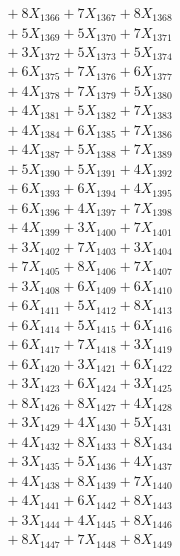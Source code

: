 \documentclass[a4paper,10pt]{article}
\begin{document}
{\begin{align}
&\;  + 8 X_{1366} + 7 X_{1367} + 8 X_{1368} \\[0.3ex]
&\;  + 5 X_{1369} + 5 X_{1370} + 7 X_{1371} \\[0.3ex]
&\;  + 3 X_{1372} + 5 X_{1373} + 5 X_{1374} \\[0.3ex]
&\;  + 6 X_{1375} + 7 X_{1376} + 6 X_{1377} \\[0.3ex]
&\;  + 4 X_{1378} + 7 X_{1379} + 5 X_{1380} \\[0.3ex]
&\;  + 4 X_{1381} + 5 X_{1382} + 7 X_{1383} \\[0.3ex]
&\;  + 4 X_{1384} + 6 X_{1385} + 7 X_{1386} \\[0.3ex]
&\;  + 4 X_{1387} + 5 X_{1388} + 7 X_{1389} \\[0.5ex]\allowbreak
&\;  + 5 X_{1390} + 5 X_{1391} + 4 X_{1392} \\[0.3ex]
&\;  + 6 X_{1393} + 6 X_{1394} + 4 X_{1395} \\[0.3ex]
&\;  + 6 X_{1396} + 4 X_{1397} + 7 X_{1398} \\[0.3ex]
&\;  + 4 X_{1399} + 3 X_{1400} + 7 X_{1401} \\[0.3ex]
&\;  + 3 X_{1402} + 7 X_{1403} + 3 X_{1404} \\[0.3ex]
&\;  + 7 X_{1405} + 8 X_{1406} + 7 X_{1407} \\[0.3ex]
&\;  + 3 X_{1408} + 6 X_{1409} + 6 X_{1410} \\[0.3ex]
&\;  + 6 X_{1411} + 5 X_{1412} + 8 X_{1413} \\[0.3ex]
&\;  + 6 X_{1414} + 5 X_{1415} + 6 X_{1416} \\[0.3ex]
&\;  + 6 X_{1417} + 7 X_{1418} + 3 X_{1419} \\[0.5ex]\allowbreak
&\;  + 6 X_{1420} + 3 X_{1421} + 6 X_{1422} \\[0.3ex]
&\;  + 3 X_{1423} + 6 X_{1424} + 3 X_{1425} \\[0.3ex]
&\;  + 8 X_{1426} + 8 X_{1427} + 4 X_{1428} \\[0.3ex]
&\;  + 3 X_{1429} + 4 X_{1430} + 5 X_{1431} \\[0.3ex]
&\;  + 4 X_{1432} + 8 X_{1433} + 8 X_{1434} \\[0.3ex]
&\;  + 3 X_{1435} + 5 X_{1436} + 4 X_{1437} \\[0.3ex]
&\;  + 4 X_{1438} + 8 X_{1439} + 7 X_{1440} \\[0.3ex]
&\;  + 4 X_{1441} + 6 X_{1442} + 8 X_{1443} \\[0.3ex]
&\;  + 3 X_{1444} + 4 X_{1445} + 8 X_{1446} \\[0.3ex]
&\;  + 8 X_{1447} + 7 X_{1448} + 8 X_{1449} \\[0.5ex]\allowbreak

\end{align}}
\end{document}
